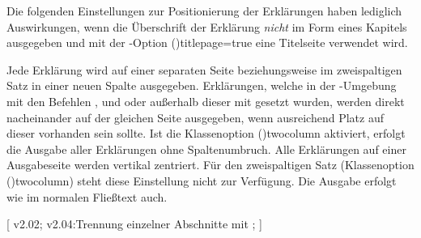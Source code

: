 \begin{DeclareEntity*}{}
\begin{DeclareEntity*}{}
\begin{DeclareEntity*}{}
\begin{Declaration}
Die folgenden Einstellungen zur Positionierung der Erklärungen haben lediglich 
Auswirkungen, wenn die Überschrift der Erklärung \emph{nicht} im Form eines 
Kapitels ausgegeben und mit der \KOMAScript-Option 
\Option(){titlepage=true} eine Titelseite verwendet wird.
%
\begin{DeclareValues}{}
  Jede Erklärung wird auf einer separaten Seite
  beziehungsweise im zweispaltigen Satz in einer neuen Spalte ausgegeben.
  Erklärungen, welche in der -Umgebung mit den 
  Befehlen ,  und  oder 
  außerhalb dieser mit  gesetzt wurden, werden direkt 
  nacheinander auf der gleichen Seite ausgegeben, wenn ausreichend Platz auf 
  dieser vorhanden sein sollte. Ist die Klassenoption 
  \Option(){twocolumn} aktiviert, erfolgt die Ausgabe 
  aller Erklärungen ohne Spaltenumbruch.
  Alle Erklärungen auf einer Ausgabeseite werden vertikal zentriert. Für 
  den zweispaltigen Satz 
  (Klassenoption \Option(){twocolumn}) steht diese 
  Einstellung nicht zur Verfügung.
  Die Ausgabe erfolgt wie im normalen Fließtext auch.
\end{DeclareValues}
\end{Declaration}

\begin{Declaration}
  {}
  [
    v2.02;
    v2.04:Trennung einzelner Abschnitte mit ;
  ]
\begin{Declaration}
  {}
\begin{Declaration}
  {}
\begin{Declaration}
  {}
\begin{Declaration}
  {}
\begin{Declaration}
  {}
\begin{Declaration}
  {}
\begin{Declaration}
  {}
\begin{Declaration}
  {}
\begin{Declaration}
  {}
\begin{Declaration}
  {}
\printdeclarationlist


\end{Declaration}
\end{Declaration}
\end{Declaration}
\end{Declaration}
\end{Declaration}
\end{Declaration}
\end{Declaration}
\end{Declaration}
\end{Declaration}
\end{Declaration}
\end{Declaration}
\end{DeclareEntity*}
\end{DeclareEntity*}
\end{DeclareEntity*}
